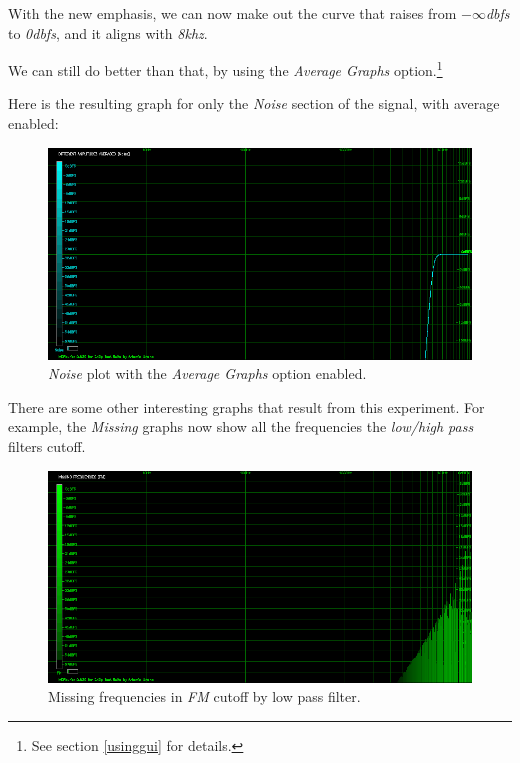 \documentclass[10pt,a4paper]{report}
\newcommand{\khz}[1]{\textit{#1\acrshort{khz}}}
\newcommand{\db}[1]{\textit{#1\acrshort{dbfs}}}
\begin{document}
With the new emphasis, we can now make out the curve that raises from \db{$-\infty$} to \db{0}, and it aligns with \khz{8}.

We can still do better than that, by using the \textit{Average Graphs} option.\footnote{See section \ref{usinggui} for details.}

Here is the resulting graph for only the \textit{Noise} section of the signal, with average enabled:

\begin{figure}[H]
	\centering
	\includegraphics[width=1.0\linewidth]{images/interpretation/Plot4-3-AVG-Noise.png}
	\caption[Noise Average]{\textit{Noise} plot with the \textit{Average Graphs} option enabled.}
	\label{fig:plot4-3-avg-noise}
\end{figure}

There are some other interesting graphs that result from this experiment. For example, the \textit{Missing} graphs now show all the frequencies the \textit{low/high pass} filters cutoff.

\begin{figure}[H]
	\centering
	\includegraphics[width=1.0\linewidth]{images/interpretation/Plot4-4-Missing-FM.png}
	\caption[Missing FM]{Missing frequencies in \textit{FM} cutoff by low pass filter.}
	\label{fig:plot4-4-missing-fm}
\end{figure}
\end{document}
